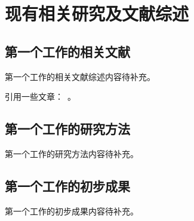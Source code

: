 \chapter{现有相关研究及文献综述}
\label{chap:work1}

\section{第一个工作的相关文献}

第一个工作的相关文献综述内容待补充。

引用一些文章：~\cite{knuth1984tex,latex2025template,wang2024automated,wang2024automated}。

\section{第一个工作的研究方法}

第一个工作的研究方法内容待补充。

\section{第一个工作的初步成果}

第一个工作的初步成果内容待补充。